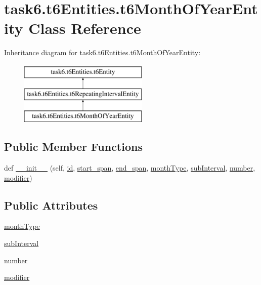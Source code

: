 \hypertarget{classtask6_1_1t6Entities_1_1t6MonthOfYearEntity}{}\section{task6.\+t6\+Entities.\+t6\+Month\+Of\+Year\+Entity Class Reference}
\label{classtask6_1_1t6Entities_1_1t6MonthOfYearEntity}
Inheritance diagram for task6.\+t6\+Entities.\+t6\+Month\+Of\+Year\+Entity\+:\begin{figure}[H]
\begin{center}
\leavevmode
\includegraphics[height=3.000000cm]{classtask6_1_1t6Entities_1_1t6MonthOfYearEntity}
\end{center}
\end{figure}
\subsection*{Public Member Functions}
\begin{DoxyCompactItemize}
\item 
def \hyperlink{classtask6_1_1t6Entities_1_1t6MonthOfYearEntity_af7ce4bf9930c43bc152684a8217e5b47}{\+\_\+\+\_\+init\+\_\+\+\_\+} (self, \hyperlink{classtask6_1_1t6Entities_1_1t6Entity_a96b2e7fb553c920ab2db6f6deb31e3b4}{id}, \hyperlink{classtask6_1_1t6Entities_1_1t6Entity_a8221c36d2995a24200cdfbd74cc9233c}{start\+\_\+span}, \hyperlink{classtask6_1_1t6Entities_1_1t6Entity_a597d42bb02fc9f42277098f0ce21917c}{end\+\_\+span}, \hyperlink{classtask6_1_1t6Entities_1_1t6MonthOfYearEntity_a7e9a4d3a60eaf47ae8106d331e1124e2}{month\+Type}, \hyperlink{classtask6_1_1t6Entities_1_1t6MonthOfYearEntity_a88989c10ade420369f1c08476b9c2785}{sub\+Interval}, \hyperlink{classtask6_1_1t6Entities_1_1t6MonthOfYearEntity_a0f5331b529c8151ed5a4ba5876c749a4}{number}, \hyperlink{classtask6_1_1t6Entities_1_1t6MonthOfYearEntity_ad295bd74c56c49bad744e89f8150bbf6}{modifier})
\end{DoxyCompactItemize}
\subsection*{Public Attributes}
\begin{DoxyCompactItemize}
\item 
\hyperlink{classtask6_1_1t6Entities_1_1t6MonthOfYearEntity_a7e9a4d3a60eaf47ae8106d331e1124e2}{month\+Type}
\item 
\hyperlink{classtask6_1_1t6Entities_1_1t6MonthOfYearEntity_a88989c10ade420369f1c08476b9c2785}{sub\+Interval}
\item 
\hyperlink{classtask6_1_1t6Entities_1_1t6MonthOfYearEntity_a0f5331b529c8151ed5a4ba5876c749a4}{number}
\item 
\hyperlink{classtask6_1_1t6Entities_1_1t6MonthOfYearEntity_ad295bd74c56c49bad744e89f8150bbf6}{modifier}
\end{DoxyCompactItemize}


